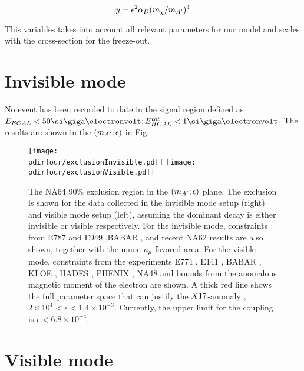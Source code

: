 \begin{equation}
  \label{eq:y-dm}
  y = \epsilon^2 \alpha_D (m_{\chi}/m_{A'})^4
\end{equation}

This variables takes into account all relevant parameters for our model and scales with the cross-section for the freeze-out.


\section{Invisible mode}
\label{ch4:sec:invis-mode}

No event has been recorded to date in the signal region defined as $E_{ECAL} < 50\gev;E_{HCAL}^{tot}<1\gev$. The results are shown in the $\dmplane$ in Fig.\

\begin{figure}[tbh!]
  \centering
  \texttt{[image: \\pdirfour/exclusionInvisible.pdf]}
  \texttt{[image: \\pdirfour/exclusionVisible.pdf]}
  \caption[Exclusion limits in the $\dmplane$]{The NA64 90\% exclusion region in the $\dmplane$ plane. The exclusion is shown for the data collected in the invisible mode setup (right) and visible mode setup (left), assuming the dominant decay is either invisible or visible respectively\cite{NA64:2019imj,Banerjee:2019hmi}. For the invisible mode, constraints from E787 and E949 \cite{PhysRevD.89.095006,Essig:2013vha},BABAR \cite{PhysRevLett.119.131804}, and recent NA62 results \cite{CortinaGil:2019nuo} are also shown, together with the muon $a_{\mu}$ favored area. For the visible mode, constraints from the experiments E774 \cite{PhysRevLett.67.2942}, E141 \cite{PhysRevLett.59.755}, BABAR \cite{babar1}, KLOE \cite{kloe2}, HADES \cite{hades}, PHENIX \cite{phenix}, NA48 \cite{na48} and bounds from the anomalous magnetic moment of the electron \cite{} are shown. A thick red line shows the full parameter space that can justify the $X17$-anomaly \cite{PhysRevD.95.035017}, $2 \times 10^{4} < \epsilon< 1.4 \times 10^{-3}$. Currently, the upper limit for the coupling is $\epsilon < 6.8 \times 10^{-4}$.}
  \label{fig:exclusion-inv}
\end{figure}

\section{Visible mode}
\label{ch4:sec:vis-mode}

